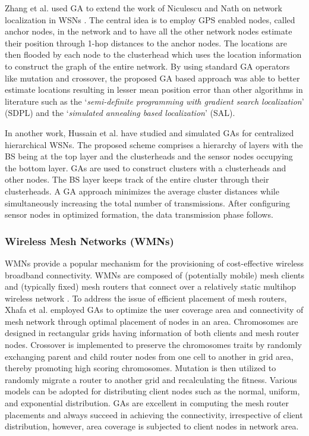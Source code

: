 \documentclass[journal]{IEEEtran}
\begin{document}
Zhang et al.\cite{zhang2008genetic} used GA to extend the work of Niculescu and Nath on network localization  in WSNs \cite{niculescu2003ad}. The central idea is to employ GPS enabled nodes, called anchor nodes, in the network and to have all the other network nodes estimate their position through 1-hop distances to the anchor nodes. The locations are then flooded by each node to the clusterhead which uses the location information to construct the graph of the entire network. By using standard GA operators like mutation and crossover, the proposed GA based approach was able to better estimate locations resulting in lesser mean position error than other algorithms in literature such as the `\textit{semi-definite programming with gradient search localization}' (SDPL) \cite{liang2004gradient} and the `\textit{simulated annealing based localization}' (SAL)\cite{kannan2005simulated}.



In another work, Hussain et al. \cite{hussain2007genetic} have studied and simulated GAs for centralized hierarchical WSNs. The proposed scheme comprises a  hierarchy of layers with the BS being at the top layer and the clusterheads and the sensor nodes occupying the bottom layer. GAs are used to construct clusters with a clusterheads and other nodes. The BS layer keeps track of the entire cluster through their clusterheads. A GA approach minimizes the average cluster distances while simultaneously increasing the total number of transmissions. After configuring sensor nodes in optimized formation, the data transmission phase follows.

\subsubsection{Wireless Mesh Networks (WMNs)}

WMNs provide a popular mechanism for the provisioning of cost-effective wireless broadband connectivity. WMNs are composed of (potentially mobile) mesh clients and (typically fixed) mesh routers that connect over a relatively static multihop wireless network \cite{chou2006low}. To address the issue of efficient placement of mesh routers, Xhafa et al. \cite{xhafa2010genetic} employed GAs to optimize the user coverage area and connectivity of mesh network through optimal placement of nodes in an area. Chromosomes are designed in rectangular grids having information of both clients and mesh router nodes. Crossover is implemented to preserve the chromosomes traits by randomly exchanging parent and child router nodes from one cell to another in grid area, thereby promoting high scoring chromosomes. Mutation is then utilized to randomly migrate a router to another grid and recalculating the fitness. Various models can be adopted for distributing client nodes such as the normal, uniform, and exponential distribution. GAs are excellent in computing the mesh router placements and always succeed in achieving the connectivity, irrespective of client distribution, however, area coverage is subjected to client nodes in network area.
\end{document}
